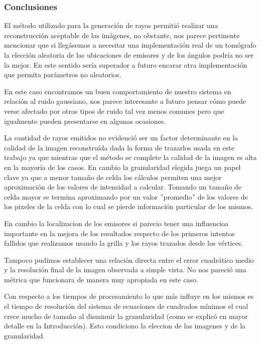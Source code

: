 \subsubsection*{Conclusiones}


\par El método utilizado para la generación de rayos permitió realizar una reconstrucción aceptable de las imágenes, no obstante, nos parece pertinente mencionar que si llegásemos a necesitar una implementación real de un tomógrafo la elección aleatoria de las ubicaciones de emisores y de los ángulos podría no ser la mejor. En este sentido sería superador a futuro encarar otra implementación que permita parámetros no aleatorios.

\par En este caso encontramos un buen comportamiento de nuestro sistema en relación al ruido gaussiano, nos parece interesante a futuro pensar cómo puede verse afectado por otros tipos de ruido tal vez menos comunes pero que igualmente pueden presentarse en algunas ocasiones. 

\par La cantidad de rayos emitidos no evidenció ser un factor determinante en la calidad de la imagen reconstruída dada la forma de trazarlos usada en este trabajo ya que mientras que el método se complete la calidad de la imagen es alta en la mayoría de los casos. En cambio la granularidad elegida juega un papel clave ya que a menor tamaño de celda los cálculos permiten una mejor aproximación de los valores de intensidad a calcular. Tomando un tamaño de celda mayor se termina aproximando por un valor ''promedio'' de los valores de los pixeles de la celda con lo cual se pierde información particular de los mismos.

\par En cambio la localizacion de los emisores si parecio tener una influencioa importante en la mejora de los resultados respecto de los primeros intentos fallidos que realizamos usando la grilla y los rayos trazados desde los vértices.

\par Tampoco pudimos establecer una relación directa entre el error cuadrático medio y la resolución final de la imagen observada a simple vista. No nos pareció una métrica que funcionara de manera muy apropiada en este caso.

\par Con respecto a los tiempos de procesamiento lo que más influye en los mismos es el tiempo de resolución del sistema de ecuaciones de cuadrados mínimos el cual crece mucho de tamaño al disminuir la granularidad (como se explicó en mayor detalle en la Introducción).
Esto condiciono la eleccion de las imagenes y de la granularidad.



